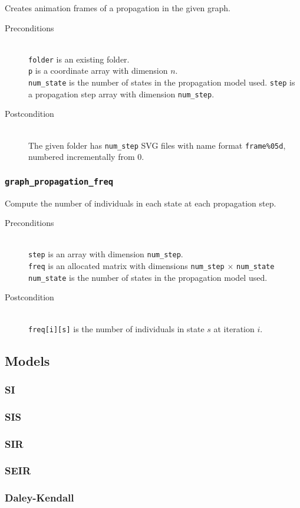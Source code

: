 Creates animation frames of a propagation in the given graph.

\begin{description}
 \item[Preconditions]~\\
   \texttt{folder} is an existing folder.\\
   \texttt{p} is a coordinate array with dimension $n$.\\
   \texttt{num\_state} is the number of states in the propagation model used.
   \texttt{step} is a propagation step array with dimension \texttt{num\_step}.
 \item[Postcondition]~\\
   The given folder has \texttt{num\_step} SVG files with name format 
   \texttt{frame\%05d}, numbered incrementally from 0.
\end{description}

\subsubsection{\texttt{graph\_propagation\_freq}}

Compute the number of individuals in each state at each propagation step.

\begin{description}
 \item[Preconditions]~\\
   \texttt{step} is an array with dimension \texttt{num\_step}.\\
   \texttt{freq} is an allocated matrix with dimensions \texttt{num\_step}
    $\times$ \texttt{num\_state} \\
   \texttt{num\_state} is the number of states in the propagation model used.
 \item[Postcondition]~\\
   \texttt{freq[i][s]} is the number of individuals in state $s$ at iteration 
    $i$.
\end{description}

\subsection{Models}

\subsubsection{SI}
\subsubsection{SIS}
\subsubsection{SIR}
\subsubsection{SEIR}
\subsubsection{Daley-Kendall}